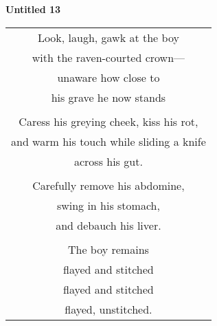 \documentclass{article}
\begin{document}
\newcommand{\h}{\hspace*{4ex}}

%
%
%
%

\begin{center}
\textbf{Untitled 13} \\ %
\vspace*{2ex}
\begin{longtable}{c}
Look, laugh, gawk at the boy \\
with the raven-courted crown--- \\
unaware how close to \\
his grave he now stands \\
\\
Caress his greying cheek, kiss his rot, \\
and warm his touch while sliding a knife \\
across his gut. \\
\\
Carefully remove his abdomine, \\
swing in his stomach, \\
and debauch his liver. \\
\\
%
%
%
The boy remains \\
flayed and stitched \\
flayed and stitched \\
flayed, unstitched. \\
\end{longtable}
\end{center}
\end{document}
